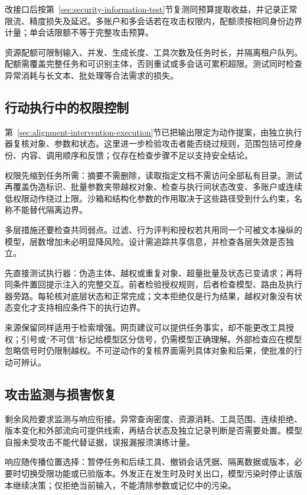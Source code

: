 改接口后按第~\ref{sec:security-information-test}节复测同预算提取收益，并记录正常限流、精度损失及延迟。多账户和多会话若在攻击权限内，配额须按相同身份边界计量；单会话限额不等于完整攻击预算。

资源配额可限制输入、并发、生成长度、工具次数及任务时长，并隔离租户队列。配额需覆盖完整任务和可识别主体，否则重试或多会话可累积超限。测试同时检查异常消耗与长文本、批处理等合法需求的损失。

\subsection{行动执行中的权限控制}
\label{sec:security-execution-defense}

第~\ref{sec:alignment-intervention-execution}节已把输出限定为动作提案，由独立执行器复核对象、参数和状态。这里进一步检验攻击者能否绕过规则，范围包括可控身份、内容、调用顺序和反馈；仅存在检查步骤不足以支持安全结论。

权限先缩到任务所需：摘要不需删除，读取指定文档不需访问全部私有目录。测试再覆盖伪造标识、批量参数夹带越权对象、检查与执行间状态改变、多账户或连续低权限动作绕过上限。沙箱和结构化参数的作用取决于这些路径受到什么约束，名称不能替代隔离边界。

多层措施还要检查共同弱点。过滤、行为评判和授权若共用同一个可被文本操纵的模型，层数增加未必明显降风险。设计需追踪共享信息，并检查各层失效是否独立。

先直接测试执行器：伪造主体、越权或重复对象、超量批量及状态已变请求；再将同条件置回提示注入的完整交互。前者检验授权规则，后者检查模型、路由及执行器旁路。每轮核对底层状态和正常完成；文本拒绝仅是行为结果，越权对象没有状态变化才支持相应条件下的执行边界。

来源保留同样适用于检索增强。网页建议可以提供任务事实，却不能更改工具授权；引号或“不可信”标记给模型区分信号，仍需模型正确理解。外部检查应在模型忽略信号时仍限制越权。不可逆动作的复核界面需列具体对象和后果，使批准的行动可辨认。

\subsection{攻击监测与损害恢复}
\label{sec:security-recovery}

剩余风险要求监测与响应衔接。异常查询密度、资源消耗、工具范围、连续拒绝、版本变化和外部流向可提供线索，再结合状态及独立记录判断是否需要处置。模型自报未受攻击不能代替证据，误报漏报须演练计量。

响应随传播位置选择：暂停任务和后续工具、撤销会话凭据、隔离数据或版本，必要时切换受限功能或已验版本。外发正在发生时及时关出口，模型污染时停止该版本继续决策；仅拒绝当前输入，不能清除参数或记忆中的污染。

